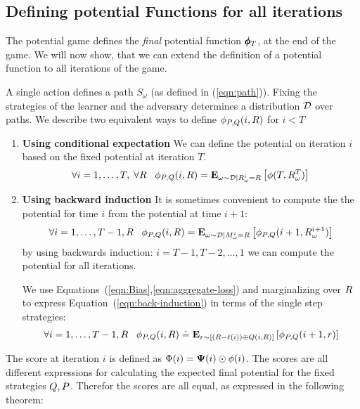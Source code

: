 \documentclass{article}[12pt]
\begin{document}
\subsection{Defining potential Functions for all iterations\label{sec:potentials}}

The potential game defines the {\em final} potential function
$\pmb{\phi}_{T}$, at the end of the game. We will now show, that we can
extend the definition of a potential function to all iterations of the game.

 A single action defines a path $S_\omega$ (as defined in (\ref{eqn:path})). Fixing
 the strategies of the learner and the adversary determines
 a distribution ${\cal D}$ over paths.
We describe two equivalent ways to define $\phi_{P,Q}(i,R)$ for $i<T$
 \begin{enumerate}
 \item{\bf Using conditional expectation} We can define the potential
   on iteration $i$ based on the fixed potential at iteration $T$.
\begin{equation}
  \forall i=1,\ldots,T,\; \forall R \;\;\;
  \phi_{P,Q}(i,R)={\bf E}_{\omega\sim {\cal D}|R_\omega^i=R}\left[ \phi(T,R_{\omega}^T) \right]
\end{equation}
 \item{\bf Using backward induction} It is sometimes convenient to
   compute the the potential for time $i$ from the potential at time
   $i+1$:
   \begin{equation} \label{eqn:back-induction}
     \forall i=1,\ldots,T-1, R\;\;\;
     \phi_{P,Q}(i,R)={\bf E}_{\omega\sim {\cal D}|M_\omega^i=R}\left[ \phi_{P,Q}(i+1,R_{\omega}^{i+1}) \right]
   \end{equation}
by using backwards induction: $i=T-1,T-2,\ldots,1$ we can compute the
potential for all iterations.


We use Equations~(\ref{eqn:Bias},\ref{eqn:aggregate-loss}) and
marginalizing over $R$ to express Equation~(\ref{eqn:back-induction})
in terms of the single step strategies:
\begin{equation} \label{eqn:induction}
  \forall i=1,\ldots,T-1, R\;\;\;
  \phi_{P,Q}(i,R) \doteq {\bf E}_{r \sim [(R-\ell(i)) \oplus Q(i,R)]}\left[ \phi_{P,Q}(i+1,r) \right]
\end{equation}

\end{enumerate}

The score at iteration $i$ is defined as
$\Phi(i)={\bf \Psi}(i)\odot \phi(i)$. The scores are all different
expressions for calculating the expected final potential for the fixed strategies
$Q, P$. Therefor the scores are all equal, as expressed
in the following theorem:
\end{document}
